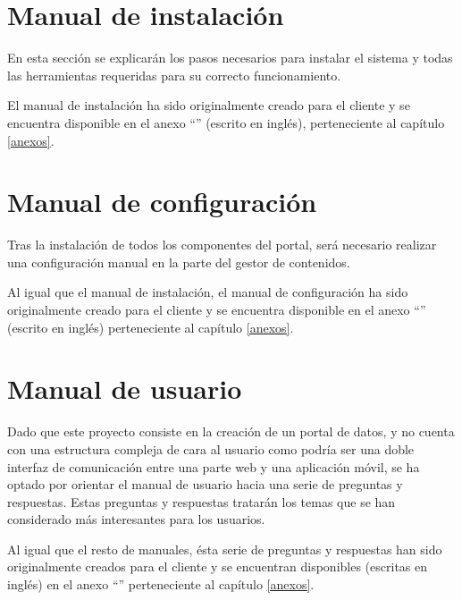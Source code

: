 \section{Manual de instalación}
En esta sección se explicarán los pasos necesarios para instalar el sistema y todas las herramientas requeridas para su correcto funcionamiento.

El manual de instalación ha sido originalmente creado para el cliente y se encuentra disponible en el anexo ``'' (escrito en inglés), perteneciente al capítulo \ref{anexos}.


\section{Manual de configuración}
Tras la instalación de todos los componentes del portal, será necesario realizar una configuración manual en la parte del gestor de contenidos.

Al igual que el manual de instalación, el manual de configuración ha sido originalmente creado para el cliente y se encuentra disponible en el anexo ``'' (escrito en inglés) perteneciente al capítulo \ref{anexos}.

\section{Manual de usuario}
Dado que este proyecto consiste en la creación de un portal de datos, y no cuenta con una estructura compleja de cara al usuario como podría ser una doble interfaz de comunicación entre una parte web y una aplicación móvil, se ha optado por orientar el manual de usuario hacia una serie de preguntas y respuestas.
Estas preguntas y respuestas tratarán los temas que se han considerado más interesantes para los usuarios.

Al igual que el resto de manuales, ésta serie de preguntas y respuestas han sido originalmente creados para el cliente y se encuentran disponibles (escritas en inglés) en el anexo ``'' perteneciente al capítulo \ref{anexos}.